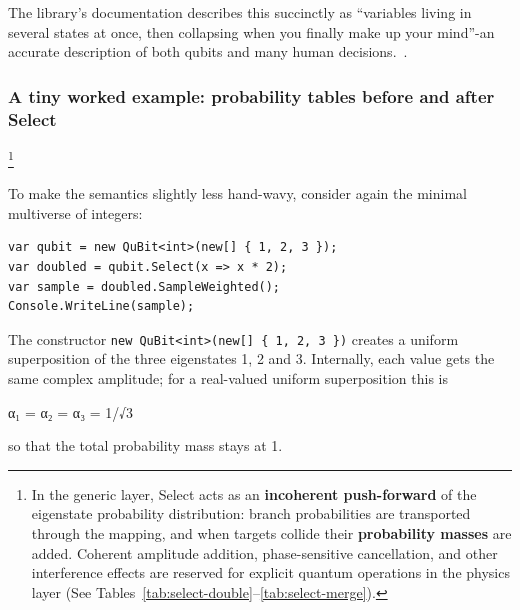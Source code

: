 \documentclass[a4paper,11pt]{article}
\begin{document}
The library's documentation describes this succinctly as ``variables living in several states at once, then collapsing when you finally make up your mind''-an accurate description of both qubits and many human decisions.~\parencite{Pau251}.
\clearpage

\subsubsection{A tiny worked example: probability tables before and after Select}\label{tiny-select-example}

\footnote{In the generic layer, Select acts as an \textbf{incoherent push-forward} of the
eigenstate probability distribution: branch probabilities are transported through the mapping,
and when targets collide their \textbf{probability masses} are added. Coherent amplitude
addition, phase-sensitive cancellation, and other interference effects are reserved for explicit
quantum operations in the physics layer (See Tables~\ref{tab:select-double}--\ref{tab:select-merge}).}

To make the semantics slightly less hand-wavy, consider again the minimal multiverse of integers:

\begin{lstlisting}[style=codeblock]
var qubit = new QuBit<int>(new[] { 1, 2, 3 });
var doubled = qubit.Select(x => x * 2);
var sample = doubled.SampleWeighted();
Console.WriteLine(sample);
\end{lstlisting}

The constructor \texttt{new QuBit<int>(new[] \{ 1, 2, 3 \})} creates a uniform superposition of the three eigenstates 1, 2 and 3. Internally, each value gets the same complex amplitude; for a real-valued uniform superposition this is

α₁ = α₂ = α₃ = 1/√3

so that the total probability mass stays at 1.
\end{document}
